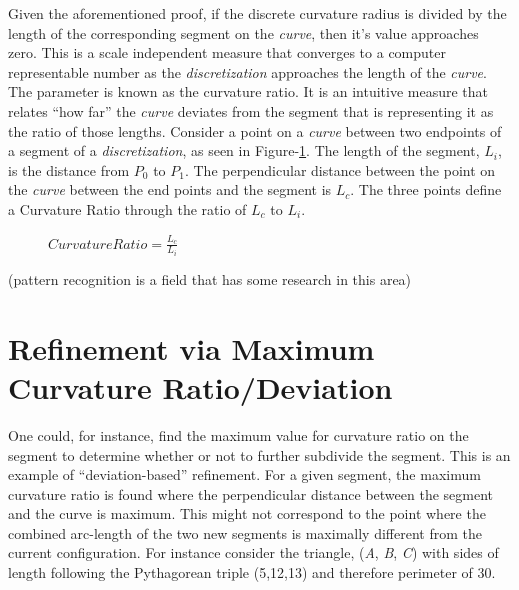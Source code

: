 \documentclass[preprint,12pt]{elsarticle}
\begin{document}
Given the aforementioned proof, if the discrete curvature radius is divided by the length of the corresponding segment on the \textit{curve}, then it’s value approaches zero. This is a scale independent measure that converges to a computer representable number as the \textit{discretization} approaches the length of the \textit{curve}. The parameter is known as the curvature ratio. It is an intuitive measure that relates ``how far'' the \textit{curve} deviates from the segment that is representing it as the ratio of those lengths. Consider a point on a \textit{curve} between two endpoints of a segment of a \textit{discretization}, as seen in Figure-\ref{CurvatureRatio}. The length of the segment, $L_i$, is the distance from $P_0$ to $P_1$. The perpendicular distance between the point on the \textit{curve} between the end points and the segment is $L_c$. The three points define a Curvature Ratio through the ratio of $L_c$ to $L_i$.

\begin{figure}[h!]
  \caption{\label{CurvatureRatio} $Curvature Ratio=  \frac{L_c}{L_i}$ \cite{mclaurin10}}
\end{figure}

(pattern recognition is a field that has some research in this area)

\section{Refinement via Maximum Curvature Ratio/Deviation}
One could, for instance, find the maximum value for curvature ratio on the segment to determine whether or not to further subdivide the segment.  This is an example of “deviation-based” refinement.  For a given segment, the maximum curvature ratio is found where the perpendicular distance between the segment and the curve is maximum.  This might not correspond to the point where the combined arc-length of the two new segments is maximally different from the current configuration.  For instance consider the triangle, (\textit{A}, \textit{B}, \textit{C}) with sides of length following the Pythagorean triple (5,12,13) and therefore perimeter of 30.
\end{document}
